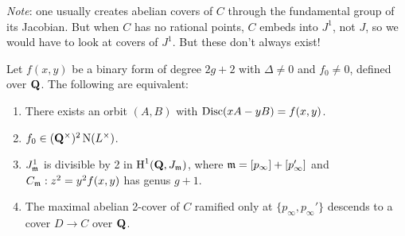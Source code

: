 \emph{Note}: one usually creates abelian covers of $C$ through the fundamental 
group of its Jacobian. But when $C$ has no rational points, $C$ embeds into 
$J^1$, not $J$, so we would have to look at covers of $J^1$. But these don't 
always exist! 

\begin{prop}
Let $f(x,y)$ be a binary form of degree $2g+2$ with $\Delta\ne 0$ and 
$f_0\ne 0$, defined over $\mathbf{Q}$. The following are equivalent:
\begin{enumerate}
  \item There exists an orbit $(A,B)$ with $\operatorname{Disc}(x A-y B)=f(x,y)$. 
  \item $f_0\in (\mathbf{Q}^\times)^2 \operatorname{N}(L^\times)$. 
  \item $J^1_{\mathfrak{m}}$ is divisible by 2 in $\operatorname{H}^1(\mathbf{Q},J_{\mathfrak{m}})$, where 
    $\mathfrak{m}=[p_\infty]+[p_\infty']$ and $C_{\mathfrak{m}}:z^2=y^2 f(x,y)$ has genus $g+1$. 
  \item The maximal abelian 2-cover of $C$ ramified only at 
    $\{p_\infty,p_\infty'\}$ descends to a cover $D\to C$ over $\mathbf{Q}$. 
\end{enumerate}
\end{prop}




